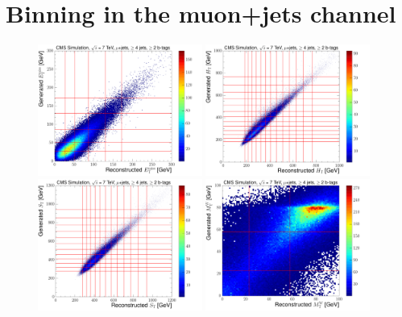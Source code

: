 \section{Binning in the muon+jets channel}
\label{as:binning_muon}

\begin{figure}[hbtp]
    \centering
     \includegraphics[width=0.48\textwidth]{Chapters/04_Analysis/04b_XSections/images/binning/muon_MET_7TeV.pdf}\hfill
     \includegraphics[width=0.48\textwidth]{Chapters/04_Analysis/04b_XSections/images/binning/muon_HT_7TeV.pdf}\\
     \includegraphics[width=0.48\textwidth]{Chapters/04_Analysis/04b_XSections/images/binning/muon_ST_7TeV.pdf}\hfill
     \includegraphics[width=0.48\textwidth]{Chapters/04_Analysis/04b_XSections/images/binning/muon_MT_7TeV.pdf}\\

\end{figure}
